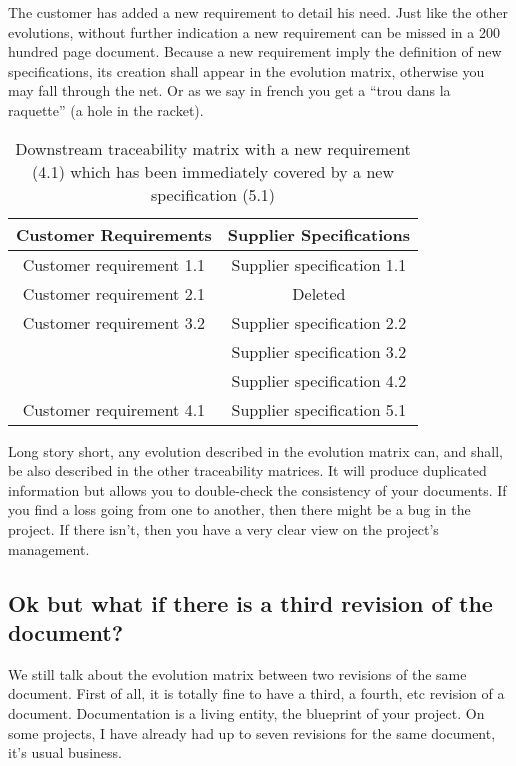 The customer has added a new requirement to detail his need. Just like the other evolutions, without further indication a new requirement can be missed in a 200 hundred page document. Because a new requirement imply the definition of new specifications, its creation shall appear in the evolution matrix, otherwise you may fall through the net. Or as we say in french you get a “trou dans la raquette” (a hole in the racket).

\begin{table}
	\centering
		\begin{tabular}{|c|c|}
			\hline
			\textbf{Customer Requirements} & \textbf{Supplier Specifications}\\
            \hline
            Customer requirement 1.1 & Supplier specification 1.1\\
            \hline
            Customer requirement 2.1 & Deleted\\
            \hline
            Customer requirement 3.2 & Supplier specification 2.2\\
            &Supplier specification 3.2\\
            &Supplier specification 4.2\\
            \hline
            Customer requirement 4.1 & Supplier specification 5.1\\
            \hline
		\end{tabular}
	\caption{Downstream traceability matrix with a new requirement (4.1) which has been immediately covered by a new specification (5.1)}
	\label{tab:DownstreamTraceabilityMatrixWithNewReq}
\end{table}

Long story short, any evolution described in the evolution matrix can, and shall, be also described in the other traceability matrices. It will produce duplicated information but allows you to double-check the consistency of your documents. If you find a loss going from one to another, then there might be a bug in the project. If there isn’t, then you have a very clear view on the project’s management.

\subsection{Ok but what if there is a third revision of the document?}
We still talk about the evolution matrix between two revisions of the same document. First of all, it is totally fine to have a third, a fourth, etc revision of a document. Documentation is a living entity, the blueprint of your project. On some projects, I have already had up to seven revisions for the same document, it’s usual business.


